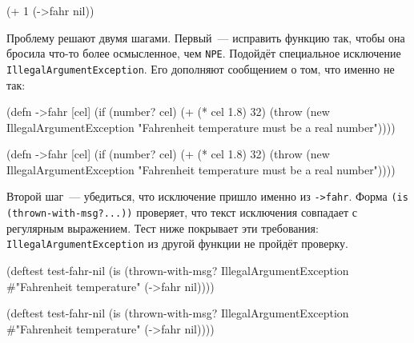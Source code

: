 \begin{english}
  \begin{clojure}
(+ 1 (->fahr nil))
  \end{clojure}
\end{english}

\label{illegal-arg}

Проблему решают двумя шагами. Первый~--- исправить функцию так, чтобы она
бросила что-то более осмысленное, чем \verb|NPE|. Подойдёт специальное
исключение \texttt{IllegalArgumentException}. Его дополняют сообщением о том,
что именно не так:

\ifx\DEVICETYPE\MOBILE

\begin{english}
  \begin{clojure}
(defn ->fahr [cel]
  (if (number? cel)
    (+ (* cel 1.8) 32)
    (throw (new IllegalArgumentException
             "Fahrenheit temperature
              must be a real number"))))
  \end{clojure}
\end{english}

\else

\begin{english}
  \begin{clojure}
(defn ->fahr [cel]
  (if (number? cel)
    (+ (* cel 1.8) 32)
    (throw (new IllegalArgumentException
            "Fahrenheit temperature must be a real number"))))
  \end{clojure}
\end{english}

\fi

Второй шаг~--- убедиться, что исключение пришло именно из \verb|->fahr|. Форма
\texttt{(is (thrown\--with-msg?...))} проверяет, что текст исключения совпадает
с регулярным выражением. Тест ниже покрывает эти требования:
\texttt{IllegalArgumentException} из другой функции не пройдёт проверку.

\ifx\DEVICETYPE\MOBILE

\begin{english}
  \begin{clojure}
(deftest test-fahr-nil
  (is (thrown-with-msg?
       IllegalArgumentException
       #"Fahrenheit temperature"
       (->fahr nil))))
  \end{clojure}
\end{english}

\else

\begin{english}
  \begin{clojure}
(deftest test-fahr-nil
  (is (thrown-with-msg?
       IllegalArgumentException #"Fahrenheit temperature"
       (->fahr nil))))
  \end{clojure}
\end{english}

